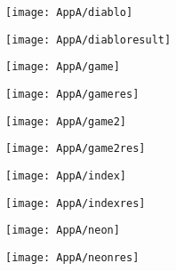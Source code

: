 \documentclass[draft,final]{vutinfth} %
\begin{document}
\begin{appendices}
\begin{figure}[H]
\begin{subfigure}[b]{0.45\columnwidth}
			\centering
			\texttt{[image: AppA/diablo]}
		\end{subfigure}
		\begin{subfigure}[b]{0.45\columnwidth}
			\centering
			\texttt{[image: AppA/diabloresult]}
		\end{subfigure}
		\end{figure} 
			\begin{figure}[H]
			\centering
			\begin{subfigure}[b]{0.45\columnwidth}
				\centering
				\texttt{[image: AppA/game]}
			\end{subfigure}
			\begin{subfigure}[b]{0.45\columnwidth}
				\centering
				\texttt{[image: AppA/gameres]}
			\end{subfigure}
		\end{figure}    
		\begin{figure}[H]
		\centering
		\begin{subfigure}[b]{0.45\columnwidth}
			\centering
			\texttt{[image: AppA/game2]}
		\end{subfigure}
		\begin{subfigure}[b]{0.45\columnwidth}
			\centering
			\texttt{[image: AppA/game2res]}
		\end{subfigure}
		\end{figure}
			\begin{figure}[H]
			\centering
			\begin{subfigure}[b]{0.45\columnwidth}
				\centering
				\texttt{[image: AppA/index]}
			\end{subfigure}
			\begin{subfigure}[b]{0.45\columnwidth}
				\centering
				\texttt{[image: AppA/indexres]}
			\end{subfigure}
		\end{figure}    
		\begin{figure}[H]
		\centering
		\begin{subfigure}[b]{0.45\columnwidth}
			\centering
			\texttt{[image: AppA/neon]}
		\end{subfigure}
		\begin{subfigure}[b]{0.45\columnwidth}
			\centering
			\texttt{[image: AppA/neonres]}
		\end{subfigure}
		\end{figure} 
			\begin{figure}[H]

\end{figure}
\end{appendices}
\end{document}
